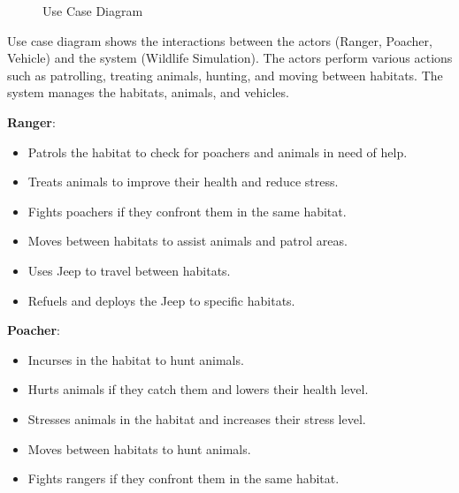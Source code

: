 \documentclass[a4paper,12pt]{article}
\begin{document}
\begin{figure}[H]
    \centering
    \caption{Use Case Diagram}
    \label{fig:use-case}
\end{figure}

\noindent Use case diagram shows the interactions between the actors (Ranger, Poacher, Vehicle) and the system (Wildlife Simulation). The actors perform various actions such as patrolling, treating animals, hunting, and moving between habitats. The system manages the habitats, animals, and vehicles.

\bigskip

\begin{flushleft}
\textbf{\large Ranger}:
\begin{itemize}
    \item Patrols the habitat to check for poachers and animals in need of help.
    \item Treats animals to improve their health and reduce stress.
    \item Fights poachers if they confront them in the same habitat.
    \item Moves between habitats to assist animals and patrol areas.
    \item Uses Jeep to travel between habitats.
    \item Refuels and deploys the Jeep to specific habitats.
\end{itemize}

\bigskip

\textbf{\large Poacher}:
\begin{itemize}
    \item Incurses in the habitat to hunt animals.
    \item Hurts animals if they catch them and lowers their health level.
    \item Stresses animals in the habitat and increases their stress level.
    \item Moves between habitats to hunt animals.
    \item Fights rangers if they confront them in the same habitat.
\end{itemize}
\end{flushleft}
\end{document}
